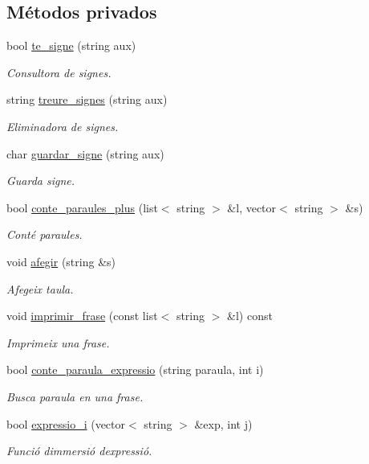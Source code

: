 \subsection*{Métodos privados}
\begin{DoxyCompactItemize}
\item 
bool \hyperlink{class_cjt___frases_a9b246a0674754ec095357038fc531425}{te\+\_\+signe} (string aux)
\begin{DoxyCompactList}\small\item\em Consultora de signes. \end{DoxyCompactList}\item 
string \hyperlink{class_cjt___frases_aedb7f629231106b7de351d695bb7524a}{treure\+\_\+signes} (string aux)
\begin{DoxyCompactList}\small\item\em Eliminadora de signes. \end{DoxyCompactList}\item 
char \hyperlink{class_cjt___frases_a7a02c62d67d06e05baccb8376fd834cb}{guardar\+\_\+signe} (string aux)
\begin{DoxyCompactList}\small\item\em Guarda signe. \end{DoxyCompactList}\item 
bool \hyperlink{class_cjt___frases_a66253708511e5472ecf9311cdb4c3557}{conte\+\_\+paraules\+\_\+plus} (list$<$ string $>$ \&l, vector$<$ string $>$ \&s)
\begin{DoxyCompactList}\small\item\em Conté paraules. \end{DoxyCompactList}\item 
void \hyperlink{class_cjt___frases_aa983e52750a3394c421ac8f49ea57e0e}{afegir} (string \&s)
\begin{DoxyCompactList}\small\item\em Afegeix taula. \end{DoxyCompactList}\item 
void \hyperlink{class_cjt___frases_a47f557da7c998905ce9ef0420075723c}{imprimir\+\_\+frase} (const list$<$ string $>$ \&l) const 
\begin{DoxyCompactList}\small\item\em Imprimeix una frase. \end{DoxyCompactList}\item 
bool \hyperlink{class_cjt___frases_a2e262e5ddc41e193b8821d6ab48cd9f7}{conte\+\_\+paraula\+\_\+expressio} (string paraula, int i)
\begin{DoxyCompactList}\small\item\em Busca paraula en una frase. \end{DoxyCompactList}\item 
bool \hyperlink{class_cjt___frases_abb52ecadbfd3fead9e055c12f2947d04}{expressio\+\_\+i} (vector$<$ string $>$ \&exp, int j)
\begin{DoxyCompactList}\small\item\em Funció d\textquotesingle{}immersió d\textquotesingle{}expressió. \end{DoxyCompactList}\end{DoxyCompactItemize}
